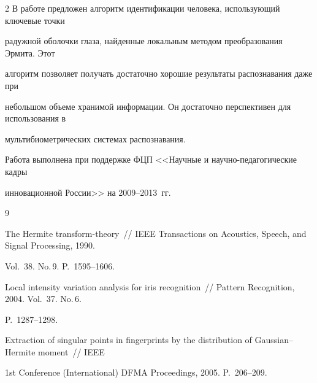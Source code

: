 \begin{multicols}{2}
В работе предложен алгоритм идентификации человека, использующий ключевые точки 


радужной оболочки глаза, найденные локальным методом преобразования Эрмита. Этот 


алгоритм позволяет получать достаточно хорошие результаты распознавания даже при 


небольшом объеме хранимой информации. Он достаточно перспективен для использования в 


мультибиометрических системах распознавания.





\bigskip


Работа выполнена при поддержке ФЦП <<Научные и научно-педагогические кадры 


инновационной России>> на 2009--2013~гг.





{\small\frenchspacing


{%




\begin{thebibliography}{9}









The Hermite transform-theory~// IEEE Transactions on Acoustics, Speech, and Signal Processing, 1990. 


Vol.~38. No.\,9. P.~1595--1606.









Local intensity variation analysis for iris recognition~// Pattern Recognition, 2004. Vol.~37. No.\,6. 


P.~1287--1298.









Extraction of singular points in fingerprints by the distribution of Gaussian--Hermite moment~// IEEE 


1st Conference (International) DFMA Proceedings, 2005. P.~206--209.






\end{thebibliography}}}
\end{multicols}
